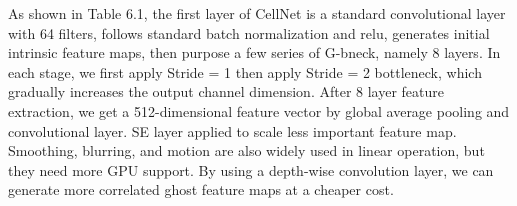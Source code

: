 As shown in Table 6.1, the first layer of CellNet is a standard convolutional layer with 64 filters, follows standard batch normalization and relu, generates initial intrinsic feature maps, then purpose a few series of G-bneck, namely 8 layers. In each stage, we first apply Stride = 1 then apply Stride = 2 bottleneck, which gradually increases the output channel dimension. After 8 layer feature extraction, we get a 512-dimensional feature vector by global average pooling and convolutional layer. SE layer applied to scale less important feature map. Smoothing, blurring, and motion are also widely used in linear operation, but they need more GPU support. By using a depth-wise convolution layer, we can generate more correlated ghost feature maps at a cheaper cost.
\begin{table}[htbp]
\centering


\end{table}
